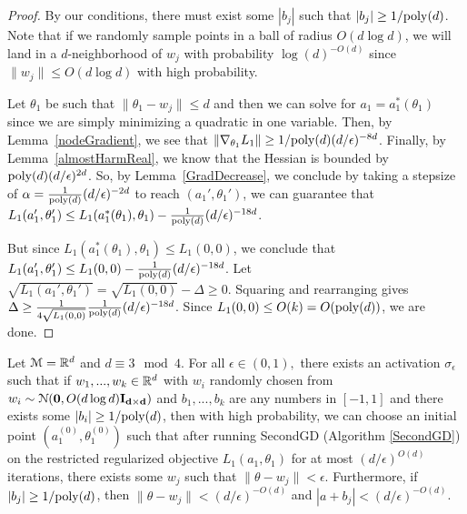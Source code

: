 \begin{proof}
By our conditions, there must exist some $|b_j|$ such that $|b_j| \geq 1/\mathrm{poly}(d)$. Note that if we randomly sample points in a ball of radius $O(d\log d)$, we will land in a $d$-neighborhood of $w_j$ with probability $\log(d)^{-O(d)}$ since $\|w_j\|\leq O(d\log d)$ with high probability. 

Let $\theta_1$ be such that $\|\theta_1 - w_j \| \leq d$ and then we can solve for $a_1 = a_1^*(\theta_1)$ since we are simply minimizing a quadratic in one variable. Then, by Lemma~\ref{nodeGradient}, we see that $\|\nabla_{\theta_1}L_1 \| \geq 1/\mathrm{poly}(d)(d/\epsilon)^{-8d}$. Finally, by Lemma~\ref{almostHarmReal}, we know that the Hessian is bounded by $\mathrm{poly}(d)(d/\epsilon)^{2d }$. So, by Lemma~\ref{GradDecrease}, we conclude by taking a stepsize of $\alpha = \frac{1}{\mathrm{poly}(d)}(d/\epsilon)^{-2d}$ to reach $(a_1',\theta_1')$, we can guarantee that $L_1(a_1', \theta_1') \leq L_1 (a_1^*(\theta_1), \theta_1) - \frac{1}{\mathrm{poly}(d)} (d/\epsilon)^{ -18d}$.

But since $L_1(a_1^*(\theta_1),\theta_1)\leq L_1(0,0)$, we conclude that $L_1(a_1', \theta_1') \leq L_1(0,0) -  \frac{1}{\mathrm{poly}(d)} (d/\epsilon)^{ -18d}$. Let $\sqrt{L_1(a_1', \theta_1')} = \sqrt{L_1(0,0)} - \Delta \geq 0$. Squaring and rearranging gives $\Delta \geq \frac{1}{4\sqrt{L_1( 0, 0)}}  \frac{1}{\mathrm{poly}(d)}(d/\epsilon)^{ -18d} $. Since $L_1(0,0) \leq O(k) = O(\mathrm{poly}(d))$, we are done. 

\end{proof}
%
\begin{lemma}\label{nodewiseSGD}
Let $\mathcal{M} = {\mathbb{R}}^{d}$ and $d\equiv 3 \mod 4$. For all $\epsilon \in (0,1),$ there exists an activation $\sigma_\epsilon$ such that if $w_1,...,w_k \in {\mathbb{R}}^d$ with $w_i$ randomly chosen from $w_i \sim  \mathcal{N}({\bf 0}, O(d\log d){\bf I_{d\times d}})$ and $b_1,...,b_k$ are any numbers in $[-1,1]$ and there exists some $|b_i| \geq 1/\mathrm{poly}(d)$, then with high probability, we can choose an initial point $(a_1^{(0)}, \theta_1^{(0)})$ such that after running SecondGD (Algorithm \ref{SecondGD}) on the restricted regularized objective $L_1(a_1,\theta_1)$ for at most $(d/\epsilon)^{O(d)}$ iterations, there exists some $w_j$ such that $\|\theta - w_j\| < \epsilon$. Furthermore, if $|b_j| \geq 1/\mathrm{poly}(d)$, then $\|\theta - w_j\| < (d/\epsilon)^{-O(d)}$ and $|a + b_j| < (d/\epsilon)^{-O(d)}$.
\end{lemma}


